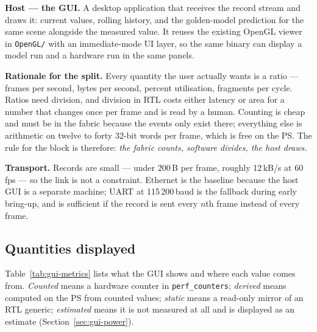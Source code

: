 \documentclass[11pt,a4paper]{article}
\newcommand{\field}[1]{\textbf{#1}\quad}
\begin{document}
\field{Host --- the GUI.} A desktop application that receives the record stream
and draws it: current values, rolling history, and the golden-model prediction
for the same scene alongside the measured value. It reuses the existing OpenGL
viewer in \texttt{OpenGL/} with an immediate-mode UI layer, so the same binary
can display a model run and a hardware run in the same panels.

\field{Rationale for the split.} Every quantity the user actually wants is a
ratio --- frames per second, bytes per second, percent utilisation, fragments
per cycle. Ratios need division, and division in RTL costs either latency or
area for a number that changes once per frame and is read by a human. Counting
is cheap and must be in the fabric because the events only exist there;
everything else is arithmetic on twelve to forty 32-bit words per frame, which
is free on the PS. The rule for the block is therefore: \emph{the fabric counts,
software divides, the host draws.}

\field{Transport.} Records are small --- under 200\,B per frame, roughly
12\,kB/s at 60\,fps --- so the link is not a constraint. Ethernet is the
baseline because the host GUI is a separate machine; UART at 115\,200\,baud is
the fallback during early bring-up, and is sufficient if the record is sent
every $n$th frame instead of every frame.

\subsection{Quantities displayed}

Table~\ref{tab:gui-metrics} lists what the GUI shows and where each value comes
from. \emph{Counted} means a hardware counter in \texttt{perf\_counters};
\emph{derived} means computed on the PS from counted values; \emph{static} means
a read-only mirror of an RTL generic; \emph{estimated} means it is not measured
at all and is displayed as an estimate (Section~\ref{sec:gui-power}).
\end{document}
